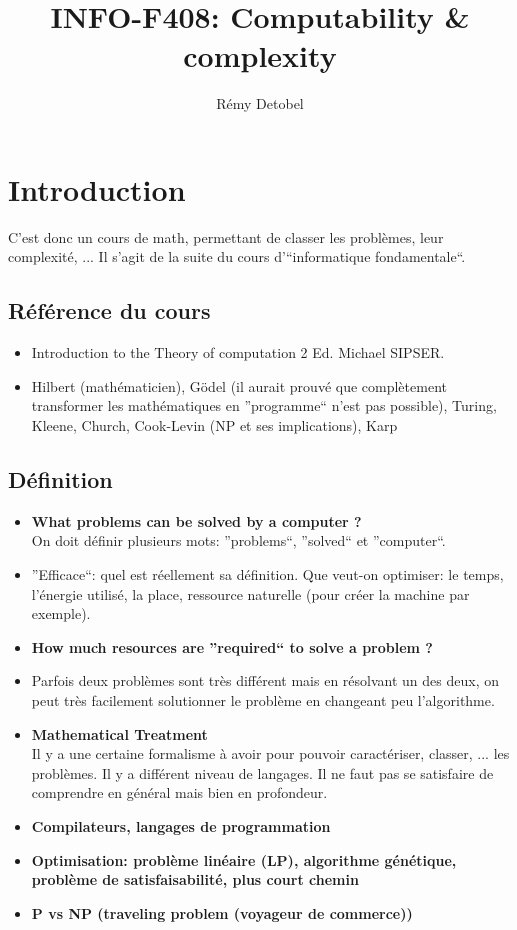 \documentclass[a4paper,12pt]{article}
\title{INFO-F408: Computability \& complexity}
\author{Rémy Detobel}
\begin{document}
\maketitle
\newpage

\section{Introduction}
  C'est donc un cours de math, permettant de classer les problèmes, leur complexité, ... Il s'agit de la suite du cours d'``informatique fondamentale``.

  \subsection{Référence du cours}
    \begin{itemize}
      \item Introduction to the Theory of computation 2 Ed.  Michael SIPSER.
      \item Hilbert (mathématicien), Gödel (il aurait prouvé que complètement transformer les mathématiques en ''programme`` n'est pas possible), Turing, Kleene, Church, Cook-Levin (NP et ses implications), Karp
    \end{itemize}
  
  \subsection{Définition}
    \begin{itemize}
      \item \textbf{What problems can be solved by a computer ?}\\
	  On doit définir plusieurs mots: ''problems``, ''solved`` et ''computer``.
      \item ''Efficace``: quel est réellement sa définition.  Que veut-on optimiser: le temps, l'énergie utilisé, la place, ressource naturelle (pour créer la machine par exemple). 
      \item \textbf{How much resources are ''required`` to solve a problem ?}
      \item Parfois deux problèmes sont très différent mais en résolvant un des deux, on peut très facilement solutionner le problème en changeant peu l'algorithme.
      \item \textbf{Mathematical Treatment}\\
	Il y a une certaine formalisme à avoir pour pouvoir caractériser, classer, ... les problèmes.  Il y a différent niveau de langages.  Il ne faut pas se satisfaire de comprendre en général mais bien en profondeur.
      \item \textbf{Compilateurs, langages de programmation}
      \item \textbf{Optimisation: problème linéaire (LP), algorithme génétique, problème de satisfaisabilité, plus court chemin}
      \item \textbf{P vs NP (traveling problem (voyageur de commerce))}
    \end{itemize}
  
\end{document}
